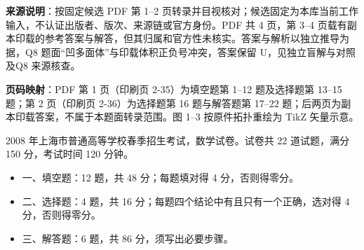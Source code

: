 

\begin{gktip}
\textbf{来源说明}：按固定候选 PDF 第 1–2 页转录并目视核对；候选固定为本库当前工作输入，不认证出版者、版次、来源链或官方身份。PDF 共 4 页，第 3–4 页载有副本印载的参考答案与解答，但其归属和官方性未核实。答案与解析以独立推导为据，Q8 题面“凹多面体”与印载体积正负号冲突，答案保留 U，见独立盲解与对照及Q8 来源核查。

\textbf{页码映射}：PDF 第 1 页（印刷页 2-35）为填空题第 1–12 题及选择题第 13–15 题；第 2 页（印刷页 2-36）为选择题第 16 题与解答题第 17–22 题；后两页为副本印载答案，不属于本题面转录范围。图 1–3 按原件拓扑重绘为 TikZ 矢量示意。
\end{gktip}


2008 年上海市普通高等学校春季招生考试，数学试卷。试卷共 22 道试题，满分 150 分，考试时间 120 分钟。

\begin{itemize}
\item 一、填空题：12 题，共 48 分；每题填对得 4 分，否则得零分。
\item 二、选择题：4 题，共 16 分；每题四个结论中有且只有一个正确，选对得 4 分，否则得零分。
\item 三、解答题：6 题，共 86 分，须写出必要步骤。
\end{itemize}


